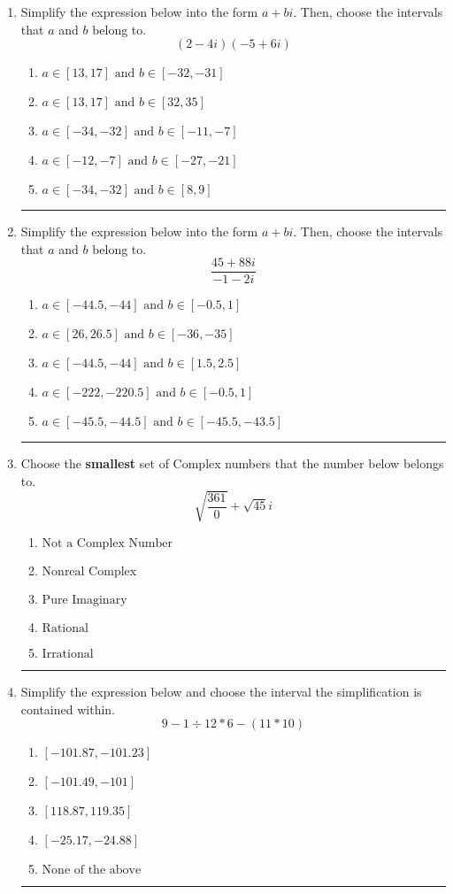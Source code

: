 \documentclass[14pt]{extbook}
\newcommand{\litem}[1]{\item#1\hspace*{-1cm}\rule{\textwidth}{0.4pt}}
\begin{document}
\begin{enumerate}
\litem{
Simplify the expression below into the form $a+bi$. Then, choose the intervals that $a$ and $b$ belong to.\[ (2 - 4 i)(-5 + 6 i) \]\begin{enumerate}[label=\Alph*.]
\item \( a \in [13, 17] \text{ and } b \in [-32, -31] \)
\item \( a \in [13, 17] \text{ and } b \in [32, 35] \)
\item \( a \in [-34, -32] \text{ and } b \in [-11, -7] \)
\item \( a \in [-12, -7] \text{ and } b \in [-27, -21] \)
\item \( a \in [-34, -32] \text{ and } b \in [8, 9] \)

\end{enumerate} }
\litem{
Simplify the expression below into the form $a+bi$. Then, choose the intervals that $a$ and $b$ belong to.\[ \frac{45 + 88 i}{-1 - 2 i} \]\begin{enumerate}[label=\Alph*.]
\item \( a \in [-44.5, -44] \text{ and } b \in [-0.5, 1] \)
\item \( a \in [26, 26.5] \text{ and } b \in [-36, -35] \)
\item \( a \in [-44.5, -44] \text{ and } b \in [1.5, 2.5] \)
\item \( a \in [-222, -220.5] \text{ and } b \in [-0.5, 1] \)
\item \( a \in [-45.5, -44.5] \text{ and } b \in [-45.5, -43.5] \)

\end{enumerate} }
\litem{
Choose the \textbf{smallest} set of Complex numbers that the number below belongs to.\[ \sqrt{\frac{361}{0}}+\sqrt{45} i \]\begin{enumerate}[label=\Alph*.]
\item \( \text{Not a Complex Number} \)
\item \( \text{Nonreal Complex} \)
\item \( \text{Pure Imaginary} \)
\item \( \text{Rational} \)
\item \( \text{Irrational} \)

\end{enumerate} }
\litem{
Simplify the expression below and choose the interval the simplification is contained within.\[ 9 - 1 \div 12 * 6 - (11 * 10) \]\begin{enumerate}[label=\Alph*.]
\item \( [-101.87, -101.23] \)
\item \( [-101.49, -101] \)
\item \( [118.87, 119.35] \)
\item \( [-25.17, -24.88] \)
\item \( \text{None of the above} \)


\end{enumerate}}
\end{enumerate}
\end{document}
